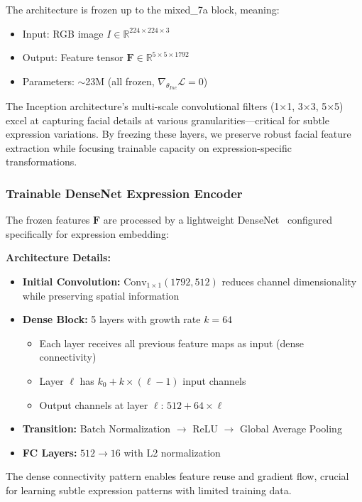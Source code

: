\documentclass[10pt,twocolumn]{article}
\begin{document}
The architecture is frozen up to the mixed\_7a block, meaning:
\begin{itemize}
    \item Input: RGB image $I \in \mathbb{R}^{224 \times 224 \times 3}$
    \item Output: Feature tensor $\mathbf{F} \in \mathbb{R}^{5 \times 5 \times 1792}$
    \item Parameters: $\sim$23M (all frozen, $\nabla_{\theta_{Inc}} \mathcal{L} = 0$)
\end{itemize}

The Inception architecture's multi-scale convolutional filters (1×1, 3×3, 5×5) excel at capturing facial details at various granularities—critical for subtle expression variations. By freezing these layers, we preserve robust facial feature extraction while focusing trainable capacity on expression-specific transformations.

\subsubsection{Trainable DenseNet Expression Encoder}
The frozen features $\mathbf{F}$ are processed by a lightweight DenseNet~\cite{huang2017densely} configured specifically for expression embedding:

\textbf{Architecture Details:}
\begin{itemize}
    \item \textbf{Initial Convolution:} $\text{Conv}_{1 \times 1}(1792, 512)$ reduces channel dimensionality while preserving spatial information
    \item \textbf{Dense Block:} 5 layers with growth rate $k=64$
    \begin{itemize}
        \item Each layer receives all previous feature maps as input (dense connectivity)
        \item Layer $\ell$ has $k_0 + k \times (\ell - 1)$ input channels
        \item Output channels at layer $\ell$: $512 + 64 \times \ell$
    \end{itemize}
    \item \textbf{Transition:} Batch Normalization $\rightarrow$ ReLU $\rightarrow$ Global Average Pooling
    \item \textbf{FC Layers:} $512 \rightarrow 16$ with L2 normalization
\end{itemize}

The dense connectivity pattern enables feature reuse and gradient flow, crucial for learning subtle expression patterns with limited training data.
\end{document}
